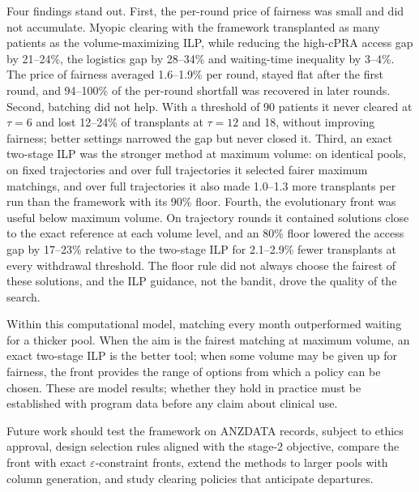 \documentclass[journal]{IEEEtran}
\begin{document}
Four findings stand out. First, the per-round price of fairness was
small and did not accumulate. Myopic clearing with the framework
transplanted as many patients as the volume-maximizing ILP, while
reducing the high-cPRA access gap by 21--24\%, the logistics gap by
28--34\% and waiting-time inequality by 3--4\%. The price of fairness
averaged 1.6--1.9\% per round, stayed flat after the first round, and
94--100\% of the per-round shortfall was recovered in later rounds.
Second, batching did not help. With a threshold of 90 patients it
never cleared at $\tau = 6$ and lost 12--24\% of transplants at
$\tau = 12$ and 18, without improving fairness; better settings
narrowed the gap but never closed it. Third, an exact two-stage ILP
was the stronger method at maximum volume: on identical pools, on
fixed trajectories and over full trajectories it selected fairer
maximum matchings, and over full trajectories it also made 1.0--1.3
more transplants per run than the framework with its 90\% floor.
Fourth, the evolutionary front was useful below maximum volume. On
trajectory rounds it contained solutions close to the exact
reference at each volume level, and an 80\% floor lowered the access
gap by 17--23\% relative to the two-stage ILP for 2.1--2.9\% fewer
transplants at every withdrawal threshold. The floor rule did not
always choose the fairest of these solutions, and the ILP guidance,
not the bandit, drove the quality of the search.

Within this computational model, matching every month outperformed
waiting for a thicker pool. When the aim is the fairest matching at
maximum volume, an exact two-stage ILP is the better tool; when some
volume may be given up for fairness, the front provides the range of
options from which a policy can be chosen. These are model results;
whether they hold in practice must be established with program data
before any claim about clinical use.

Future work should test the framework on ANZDATA records, subject to
ethics approval, design selection rules aligned with the stage-2
objective, compare the front with exact $\varepsilon$-constraint
fronts, extend the methods to larger pools with column generation,
and study clearing policies that anticipate departures.

\balance


\end{document}
